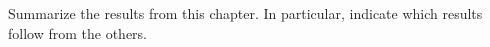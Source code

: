 \documentclass[noauthor,nooutcomes,12pt,hints,newpage,handout]{ximera}
\begin{document}



\begin{problem}
Summarize the results from this chapter. In particular, indicate which
results follow from the others.
\end{problem}
\end{document}

